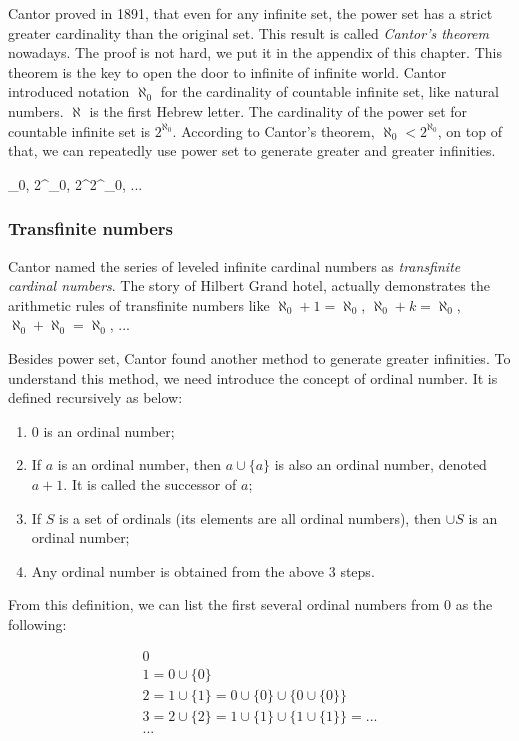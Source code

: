 \documentclass{article}
\begin{document}
Cantor proved in 1891, that even for any infinite set, the power set has a strict greater cardinality than the original set. This result is called {\em Cantor's theorem} nowadays. The proof is not hard, we put it in the appendix of this chapter. This theorem is the key to open the door to infinite of infinite world. Cantor introduced notation $\aleph_0$ for the cardinality of countable infinite set, like natural numbers. $\aleph$ is the first Hebrew letter. The cardinality of the power set for countable infinite set is $2^{\aleph_0}$. According to Cantor's theorem, $\aleph_0 < 2^{\aleph_0}$, on top of that, we can repeatedly use power set to generate greater and greater infinities.

\be
\aleph_0, 2^{\aleph_0}, 2^{2^{\aleph_0}}, ...
\ee

\subsubsection{Transfinite numbers}

Cantor named the series of leveled infinite cardinal numbers as {\em transfinite cardinal numbers}. The story of Hilbert Grand hotel, actually demonstrates the arithmetic rules of transfinite numbers like $\aleph_0 + 1 = \aleph_0$, $\aleph_0 + k = \aleph_0 $, $\aleph_0 + \aleph_0 = \aleph_0$, ...

Besides power set, Cantor found another method to generate greater infinities. To understand this method, we need introduce the concept of ordinal number. It is defined recursively as below:

\begin{enumerate}
\item 0 is an ordinal number;
\item If $a$ is an ordinal number, then $a \cup \{a\}$ is also an ordinal number, denoted $a + 1$. It is called the successor of $a$;
\item If $S$ is a set of ordinals (its elements are all ordinal numbers), then $\cup S$ is an ordinal number;
\item Any ordinal number is obtained from the above 3 steps.
\end{enumerate}

From this definition, we can list the first several ordinal numbers from 0 as the following:

\[
\begin{array}{l}
0 \\
1 = 0 \cup \{0\} \\
2 = 1 \cup \{1\} = 0 \cup \{0\} \cup \{0 \cup \{0\}\} \\
3 = 2 \cup \{2\} = 1 \cup \{1\} \cup \{1 \cup \{1\}\} = ... \\
... \\
\end{array}
\]
\end{document}
